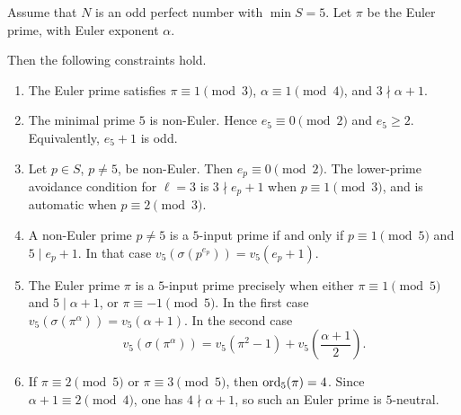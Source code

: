 \begin{lemma}[Surviving exponent schemas in the branch $\min S=5$]
\label{lem:q5-surviving-exponent-schemas}
Assume that \(N\) is an odd perfect number with \(\min S=5\).  Let \(\pi\) be
the Euler prime, with Euler exponent \(\alpha\).

Then the following constraints hold.

\begin{enumerate}[label=(\roman*),leftmargin=2.2em]

\item The Euler prime satisfies \(\pi\equiv1\pmod3\),
      \(\alpha\equiv1\pmod4\), and \(3\nmid\alpha+1\).

\item The minimal prime \(5\) is non-Euler.  Hence
      \(e_5\equiv0\pmod2\) and \(e_5\ge2\).
      Equivalently, \(e_5+1\) is odd.

\item Let \(p\in S\), \(p\ne5\), be non-Euler.  Then
      \(e_p\equiv0\pmod2\).
      The lower-prime avoidance condition for \(\ell=3\) is
      \(3\nmid e_p+1\) when \(p\equiv1\pmod3\), and is automatic when
      \(p\equiv2\pmod3\).

\item A non-Euler prime \(p\ne5\) is a \(5\)-input prime if and only if
      \(p\equiv1\pmod5\) and \(5\mid e_p+1\).
      In that case \(v_5(\sigma(p^{e_p}))=v_5(e_p+1)\).

\item The Euler prime \(\pi\) is a \(5\)-input prime precisely when either
      \(\pi\equiv1\pmod5\) and \(5\mid\alpha+1\), or
      \(\pi\equiv-1\pmod5\).
      In the first case \(v_5(\sigma(\pi^\alpha))=v_5(\alpha+1)\).
      In the second case
      \[
        v_5(\sigma(\pi^\alpha))
        =
        v_5(\pi^2-1)+v_5\!\left(\frac{\alpha+1}{2}\right).
      \]

\item If \(\pi\equiv2\pmod5\) or \(\pi\equiv3\pmod5\), then
      \(\operatorname{ord}_5(\pi)=4\).  Since \(\alpha+1\equiv2\pmod4\), one has
      \(4\nmid\alpha+1\), so such an Euler prime is \(5\)-neutral.
\end{enumerate}
\end{lemma}

